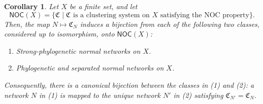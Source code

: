 \documentclass[preprint]{elsarticle}
\newtheorem{corollary}[theorem]{Corollary}
\newcommand{\CS}[1][]{\ensuremath{\mathfrak{C}_{#1}}}
\begin{document}
\begin{corollary}\label{cor:bijection-normal-noc}
Let $X$ be a finite set, and let
\[
\mathsf{NOC}(X) =
\{\CS \mid \CS \text{ is a clustering system on } X \text{ satisfying the NOC property}\}.
\]
Then, the map $ N\mapsto \CS[N] $
induces a bijection from each of the following two classes, considered up to isomorphism, onto $\mathsf{NOC}(X)$:
\begin{enumerate}[(1)]
\item Strong-phylogenetic normal networks on $X$.
\item Phylogenetic  and separated normal networks on $X$.
\end{enumerate}
Consequently, there is a canonical bijection between the classes in (1) and (2): a network $N$ in
(1) is mapped to the unique network $N'$ in (2) satisfying $ \CS[N']=\CS[N]$.
\end{corollary}
\end{document}
